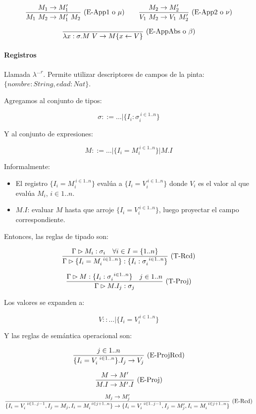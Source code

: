 \[\frac{M_1 \to M_1'}{M_1\ M_2 \to M_1'\ M_2}\ \text{(E-App1 o $\mu$)}\quad\quad \frac{M_2 \to M_2'}{V_1\ M_2 \to V_1\ M_2'}\ \text{(E-App2 o $\nu$)}\]

\[\frac{}{\lambda x:\sigma.M\ V \to M\{x\leftarrow V\}}\ \text{(E-AppAbs o $\beta$)}\]

\paragraph{Registros}

Llamada $\lambda^{\dots r}$. Permite utilizar descriptores de campos de la pinta: $\{nombre: String, edad: Nat\}$.

Agregamos al conjunto de tipos:

\[\sigma ::= \dots \vert \{I_i : \sigma_i^{\ i \in 1..n}\}\]

Y al conjunto de expresiones:

\[M ::= \dots \vert \{I_i = M_i^{\ i \in 1..n}\} \vert M.I\]

Informalmente:
\begin{itemize}
  \item El registro $\{I_i = M_i^{\ i \in 1..n}\}$ evalúa a $\{I_i = V_i^{\ i \in 1..n}\}$ donde $V_i$ es el valor al que evalúa $M_i$, $i \in 1..n$.
  \item $M.I$: evaluar $M$ hasta que arroje $\{I_i = V_i^{\ i \in 1..n}\}$, luego proyectar el campo correspondiente.
\end{itemize}

Entonces, las reglas de tipado son:

\[\frac{\Gamma \rhd M_i : \sigma_i\quad \forall i \in I = \{1..n\}}{\Gamma \rhd \{I_i = M_i^{\ i \in 1..n}\}:\{I_i : \sigma_i^{\ i \in 1..n}\}}\ \text{(T-Rcd)}\]

\[\frac{\Gamma \rhd M : \{I_i : \sigma_{i}^{\ i \in 1..n}\}\quad j\in 1..n}{\Gamma \rhd M.I_j : \sigma_j}\ \text{(T-Proj)}\]

Los valores se expanden a:

\[V :: \dots \vert \{I_i = V_i^{\ i \in 1..n}\}\]

Y las reglas de semántica operacional son:

\[\frac{j \in 1..n}{\{I_i = V_i^{\ i \in 1..n}\}.I_j \to V_j}\ \text{(E-ProjRcd)}\]

\[\frac{M \to M'}{M.I \to M'.I}\ \text{(E-Proj)}\]

\[\deriv{M_j \to M_j'}{\{I_i = V_i^{\ i \in 1..j-1}, I_j = M_j, I_i = M_i^{\ i \in j+1..n}\} \to \{I_i = V_i^{\ i \in 1..j-1}, I_j = M_j', I_i = M_i^{\ i \in j+1..n}\}}{E-Rcd}\]

